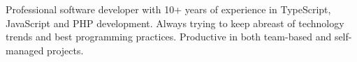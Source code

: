 
\vspace{3mm}


\begin{cvparagraph}

Professional software developer with 10+ years of experience in TypeScript, JavaScript and PHP development.
Always trying to keep abreast of technology trends and best programming practices.
Productive in both team-based and self-managed projects.
\end{cvparagraph}
\vspace{-2mm}
